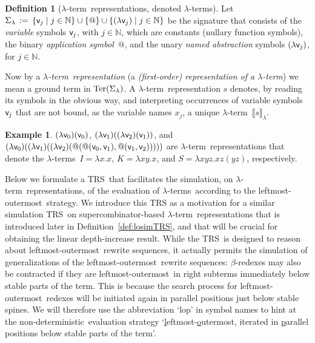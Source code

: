 \documentclass[
submission
]{dmtcs-episciences-tampered}
\makeatletter
\newcommand{\fap}[2]{#1({#2})}
\newcommand{\bfap}[3]{{#1}({#2},\hspace*{0.05pt}{#3})}
\newcommand{\indap}[2]{#1 _{#2}}
\newcommand{\nb}{\nobreakdash}
\newcommand{\nf}{\normalfont}
\newcommand{\sdefdby}{{:=}}
\newcommand{\defdby}{\mathrel{\sdefdby}}
\newcommand{\descsetexpmid}{\mathrel{\vert}}
\newcommand{\descsetexp}[2]{\left\{{#1}\descsetexpmid{#2}\right\}}
\newcommand{\setexp}[1]{\left\{{#1}\right\}}
\newcommand{\nat}{\mathbb{N}}
\newcommand{\avar}{x}
\newcommand{\bvar}{y}
\newcommand{\cvar}{z}
\newcommand{\avari}{\indap{\avar}}
\newcommand{\ater}{s}
\newcommand{\asig}{\Sigma}
\newcommand{\asiglambda}{\indap{\asig}{\lambda}}
\newcommand{\TRS}{TRS}
\newcommand{\stermsover}{\text{\nf Ter}}
\newcommand{\termsover}{\fap{\stermsover}}
\newcommand{\sfolapp}{@}
\newcommand{\sfolabs}[1]{(\lambda{#1})}
\newcommand{\folapp}{\bfap{\sfolapp}}
\newcommand{\folabs}[1]{\fap{\sfolabs{#1}}}
\newcommand{\afovar}{\mathsf{v}}
\newcommand{\afovari}[1]{\indap{\afovar}{\hspace*{-0.25pt}#1}}
\newcommand{\denlter}[1]{\llbracket{#1}\rrbracket_{\sslabs}}
\newcommand{\sslabs}{\lambda}
\newcommand{\slabs}[1]{\sslabs{#1}.}
\newcommand{\labs}[2]{\slabs{#1}{#2}}
\newcommand{\lapp}[2]{{#1}{#2}}
\newcommand{\lambdaterm}{$\lambda$\nb-term}
\newcommand{\lambdaterms}{\lambdaterm{s}}
\newcommand{\betaredex}{$\beta$\nb-re\-dex}
\newcommand{\lo}{left\-most-outer\-most}
\newcommand{\nondeterministic}{non-de\-ter\-min\-istic}
\theoremstyle{plain}
\theoremstyle{definition}
\newtheorem{definition}[theorem]{Definition}
\newtheorem{example}[theorem]{Example}
\makeatother
\begin{document}
\begin{definition}[\lambdaterm\ representations, denoted \lambdaterms]\label{def:ltermrep}
  Let
$
    \asiglambda 
      \,\defdby\, 
    \descsetexp{ \afovari{j} }{ j\in\nat }
      \cup 
    \setexp{ \sfolapp }  
      \cup
    \descsetexp{ \sfolabs{\afovari{j}} }{ j\in\nat } $
be the signature that
  consists of the \emph{variable} symbols $\afovari{j}$, with $j\in\nat$, which are constants (nullary function symbols),
  the binary \emph{application symbol}~$\sfolapp$,
  and the unary \emph{named abstraction} symbols $\sfolabs{\afovari{j}}$, for $j\in\nat$.
  
  Now by a \emph{\lambdaterm\ representation} (a \emph{(first-order) representation of a \lambdaterm})
  we mean a ground term in $\termsover{\asiglambda}$. 
  A \lambdaterm\ representation $\ater$ denotes, by reading its symbols in the obvious way,
  and interpreting occurrences of variable symbols $\afovari{j}$ that are not bound,
  as the variable names $\avari{j}$, a unique \lambdaterm\ $\denlter{\ater}$.
  
  
  
  
  
  
\end{definition}

\begin{example}
  $\folabs{\afovari{0}}{\afovari{0}}$,
  $\folabs{\afovari{1}}{\folabs{\afovari{2}}{\afovari{1}}}$, and
  $\folabs{\afovari{0}}{\folabs{\afovari{1}}{\folabs{\afovari{2}}{\folapp{\folapp{\afovari{0}}{\afovari{1}}}{\folapp{\afovari{1}}{\afovari{2}}}}}}$
  are \lambdaterm\ representations that denote the \lambdaterms\
  $I = \labs{\avar}{\avar}$,
  $K = \labs{\avar\bvar}{\avar}$,
  and 
  $S = \labs{\avar\bvar\cvar}{\lapp{\lapp{\avar}{\cvar}}{(\lapp{\bvar}{\cvar})}}$,
  respectively.
\end{example}
    
Below we formulate a \TRS\ that facilitates the simulation, on \lambdaterm\ representations,
of the evaluation of \lambdaterms\ according to the \lo\ strategy.
We introduce this TRS as a motivation for a similar simulation \TRS\ on super\-com\-bi\-na\-tor-based \lambdaterm\ representations
that is introduced later in Definition~\ref{def:losimTRS}, and that will be crucial for obtaining the linear depth-increase result. 
While the \TRS\ is designed to reason about \lo\ rewrite sequences, it actually permits the simulation of generalizations of the \lo\ rewrite sequences:
\betaredex{es} may also be contracted if they are \lo\ in right subterms immediately below stable parts of the term. 
This is because the search process for \lo\ redexes will be initiated again in parallel positions just below stable spines. 
We will therefore use the abbreviation `lop' in symbol names to hint at 
the \nondeterministic\ evaluation strategy `\underline{l}eftmost-\underline{o}utermost, iterated in \underline{p}arallel positions below stable parts of the term'. 
\end{document}
